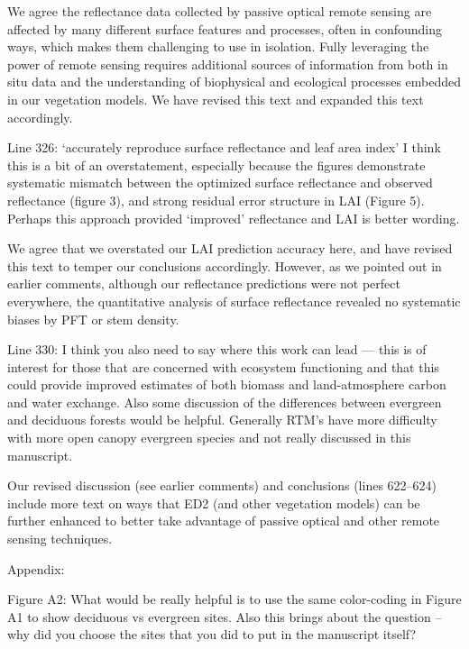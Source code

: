 We agree the reflectance data collected by passive optical remote sensing are affected by many different surface features and processes, often in confounding ways, which makes them challenging to use in isolation.
Fully leveraging the power of remote sensing requires additional sources of information from both in situ data and the understanding of biophysical and ecological processes embedded in our vegetation models.
We have revised this text and expanded this text accordingly.

\begin{reviewer}
  Line 326: ‘accurately reproduce surface reflectance and leaf area index’ I think this is a bit of an overstatement, especially because the figures demonstrate systematic mismatch between the optimized surface reflectance and observed reflectance (figure 3), and strong residual error structure in LAI (Figure 5). Perhaps this approach provided ‘improved’ reflectance and LAI is better wording.
\end{reviewer}

We agree that we overstated our LAI prediction accuracy here, and have revised this text to temper our conclusions accordingly.
However, as we pointed out in earlier comments, although our reflectance predictions were not perfect everywhere, the quantitative analysis of surface reflectance revealed no systematic biases by PFT or stem density.

\begin{reviewer}
  Line 330: I think you also need to say where this work can lead — this is of interest for those that are concerned with ecosystem functioning and that this could provide improved estimates of both biomass and land-atmosphere carbon and water exchange. Also some discussion of the differences between evergreen and deciduous forests would be helpful. Generally RTM’s have more difficulty with more open canopy evergreen species and not really discussed in this manuscript.
\end{reviewer}

Our revised discussion (see earlier comments) and conclusions (lines 622--624) include more text on ways that ED2 (and other vegetation models) can be further enhanced to better take advantage of passive optical and other remote sensing techniques.

\begin{reviewer}
Appendix:

Figure A2: What would be really helpful is to use the same color-coding in Figure A1 to show deciduous vs evergreen sites. Also this brings about the question – why did you choose the sites that you did to put in the manuscript itself?
\end{reviewer}

